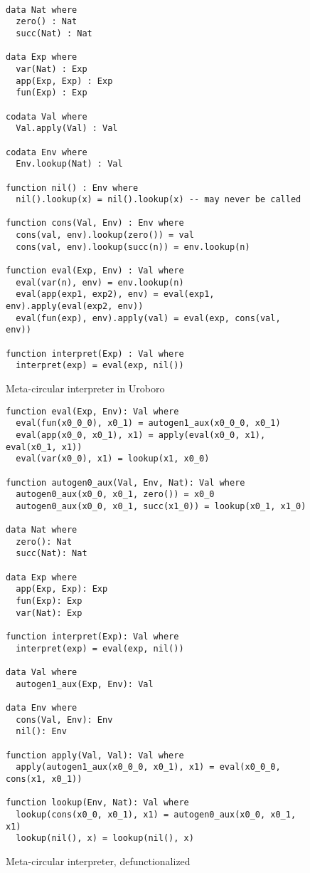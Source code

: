 \begin{figure}
\begin{lstlisting}

data Nat where
  zero() : Nat
  succ(Nat) : Nat

data Exp where
  var(Nat) : Exp
  app(Exp, Exp) : Exp
  fun(Exp) : Exp

codata Val where
  Val.apply(Val) : Val

codata Env where
  Env.lookup(Nat) : Val

function nil() : Env where
  nil().lookup(x) = nil().lookup(x) -- may never be called

function cons(Val, Env) : Env where
  cons(val, env).lookup(zero()) = val
  cons(val, env).lookup(succ(n)) = env.lookup(n)

function eval(Exp, Env) : Val where
  eval(var(n), env) = env.lookup(n)
  eval(app(exp1, exp2), env) = eval(exp1, env).apply(eval(exp2, env))
  eval(fun(exp), env).apply(val) = eval(exp, cons(val, env))

function interpret(Exp) : Val where
  interpret(exp) = eval(exp, nil())

\end{lstlisting}
\caption{Meta-circular interpreter in Uroboro}
\label{fig:mci}
\end{figure}

\begin{figure}

\begin{lstlisting}
function eval(Exp, Env): Val where
  eval(fun(x0_0_0), x0_1) = autogen1_aux(x0_0_0, x0_1)
  eval(app(x0_0, x0_1), x1) = apply(eval(x0_0, x1), eval(x0_1, x1))
  eval(var(x0_0), x1) = lookup(x1, x0_0)

function autogen0_aux(Val, Env, Nat): Val where
  autogen0_aux(x0_0, x0_1, zero()) = x0_0
  autogen0_aux(x0_0, x0_1, succ(x1_0)) = lookup(x0_1, x1_0)

data Nat where
  zero(): Nat
  succ(Nat): Nat

data Exp where
  app(Exp, Exp): Exp
  fun(Exp): Exp
  var(Nat): Exp

function interpret(Exp): Val where
  interpret(exp) = eval(exp, nil())

data Val where
  autogen1_aux(Exp, Env): Val

data Env where
  cons(Val, Env): Env
  nil(): Env

function apply(Val, Val): Val where
  apply(autogen1_aux(x0_0_0, x0_1), x1) = eval(x0_0_0, cons(x1, x0_1))

function lookup(Env, Nat): Val where
  lookup(cons(x0_0, x0_1), x1) = autogen0_aux(x0_0, x0_1, x1)
  lookup(nil(), x) = lookup(nil(), x)
\end{lstlisting}
\caption{Meta-circular interpreter, defunctionalized}
\label{fig:mcidefunced}
\end{figure}

